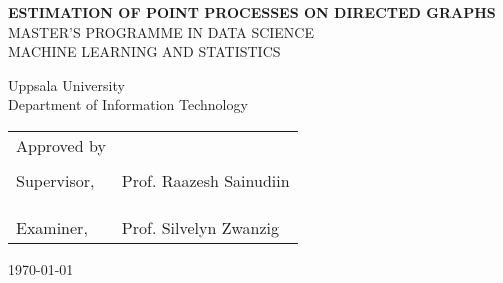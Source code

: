 
\thispagestyle{empty}

\vspace*{+5em}
\begin{center}
\textbf{ESTIMATION OF POINT PROCESSES ON DIRECTED GRAPHS}\\
\vspace*{+4em}
\vspace{+2em}
MASTER’S PROGRAMME IN DATA SCIENCE\\
MACHINE LEARNING AND STATISTICS

\vspace*{+3em}
Uppsala University\\
Department of Information Technology\\
\vspace*{+2em}

\end{center}

\begin{tabular}{ l l }
 Approved by &   \\
  & \\
  Supervisor, & Prof. Raazesh Sainudiin \\ 
  & \\
  & \\
  & \\
 Examiner, & Prof. Silvelyn Zwanzig \\ 
\end{tabular}

\vspace*{+4em}

\begin{center}
\today
\end{center}

